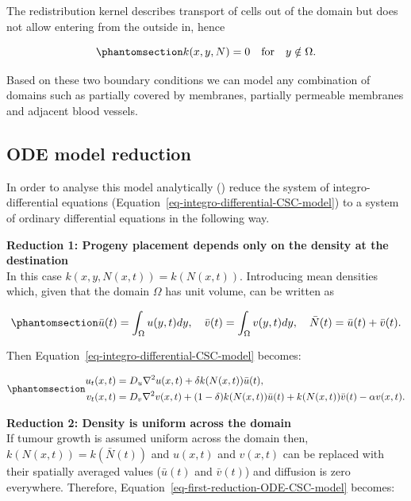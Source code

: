\documentclass[
  letterpaper,
]{scrreprt}
\theoremstyle{definition}
\theoremstyle{remark}
\begin{document}
The redistribution kernel describes transport of cells out of the domain
but does not allow entering from the outside in, hence

\begin{equation}\phantomsection\label{eq-redistribution-kernel-dirichlet-BC}{
k(x,y,N) = 0 \quad \text{for} \quad y \notin \Omega.
}\end{equation}

Based on these two boundary conditions we can model any combination of
domains such as partially covered by membranes, partially permeable
membranes and adjacent blood vessels.

\subsection{ODE model reduction}\label{sec-ode-model-reduction}

In order to analyse this model analytically
()
reduce the system of integro-differential equations
(Equation~\ref{eq-integro-differential-CSC-model}) to a system of
ordinary differential equations in the following way.

\textbf{Reduction 1: Progeny placement depends only on the density at
the destination}\\
In this case \(k(x,y,N(x,t)) = k(N(x,t))\). Introducing mean densities
which, given that the domain \(\Omega\) has unit volume, can be written
as

\begin{equation}\phantomsection\label{eq-density-mean}{
\bar{u}(t) = \int_{\Omega} u(y,t) dy, \quad \bar{v}(t) = \int_{\Omega} v(y,t) dy, \quad \bar{N}(t) = \bar{u}(t) + \bar{v}(t).
}\end{equation}

Then Equation~\ref{eq-integro-differential-CSC-model} becomes:

\begin{equation}\phantomsection\label{eq-first-reduction-ODE-CSC-model}{
\begin{aligned}
u_t(x,t) &= D_u \nabla^2 u(x,t) + \delta   k(N(x,t))\bar{u}(t), \\
v_t(x,t) &= D_v \nabla^2 v(x,t) + (1-\delta)   k(N(x,t))\bar{u}(t) + k(N(x,t))\bar{v}(t) - \alpha v(x,t).
\end{aligned}
}\end{equation}

\textbf{Reduction 2: Density is uniform across the domain}\\
If tumour growth is assumed uniform across the domain then,
\(k(N(x,t)) = k(\bar{N}(t))\) and \(u(x,t)\) and \(v(x,t)\) can be
replaced with their spatially averaged values (\(\bar{u}(t)\) and
\(\bar{v}(t)\)) and diffusion is zero everywhere. Therefore,
Equation~\ref{eq-first-reduction-ODE-CSC-model} becomes:
\end{document}
